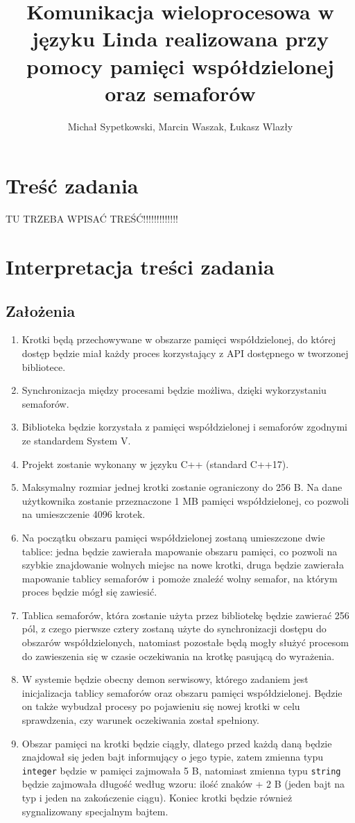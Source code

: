 \documentclass{article}
\title{Komunikacja wieloprocesowa w języku Linda realizowana przy pomocy pamięci współdzielonej oraz semaforów}
\author{Michał Sypetkowski, Marcin Waszak, Łukasz Wlazły}
\date{}
\begin{document}
	\maketitle
	\newpage
	
	\section{Treść zadania}
	TU TRZEBA WPISAĆ TREŚĆ!!!!!!!!!!!!!
	
	\section{Interpretacja treści zadania}
	\subsection{Założenia}
	\begin{enumerate}
		\item Krotki będą przechowywane w obszarze pamięci współdzielonej, do której dostęp będzie miał każdy proces korzystający z API dostępnego w tworzonej bibliotece.
		\item Synchronizacja między procesami będzie możliwa, dzięki wykorzystaniu semaforów.
		\item Biblioteka będzie korzystała z pamięci współdzielonej i semaforów zgodnymi ze standardem System V.
		\item Projekt zostanie wykonany w języku C++ (standard C++17).
		\item Maksymalny rozmiar jednej krotki zostanie ograniczony do 256 B. Na dane użytkownika zostanie przeznaczone 1 MB pamięci współdzielonej, co pozwoli na umieszczenie 4096 krotek.
		\item Na początku obszaru pamięci współdzielonej zostaną umieszczone dwie tablice: jedna będzie zawierała mapowanie obszaru pamięci, co pozwoli na szybkie znajdowanie wolnych miejsc na nowe krotki, druga będzie zawierała mapowanie tablicy semaforów i pomoże znaleźć wolny semafor, na którym proces będzie mógł się zawiesić.
		\item Tablica semaforów, która zostanie użyta przez bibliotekę będzie zawierać 256 pól, z czego pierwsze cztery zostaną użyte do synchronizacji dostępu do obszarów współdzielonych, natomiast pozostałe będą mogły służyć procesom do zawieszenia się w czasie oczekiwania na krotkę pasującą do wyrażenia.
		\item W systemie będzie obecny demon serwisowy, którego zadaniem jest inicjalizacja tablicy semaforów oraz obszaru pamięci współdzielonej. Będzie on także wybudzał procesy po pojawieniu się nowej krotki w celu sprawdzenia, czy warunek oczekiwania został spełniony.
		\item Obszar pamięci na krotki będzie ciągły, dlatego przed każdą daną będzie znajdował się jeden bajt informujący o jego typie, zatem zmienna typu \texttt{integer} będzie w pamięci zajmowała 5 B, natomiast zmienna typu \texttt{string} będzie zajmowała długość według wzoru: ilość znaków + 2 B (jeden bajt na typ i jeden na zakończenie ciągu). Koniec krotki będzie również sygnalizowany specjalnym bajtem.
	\end{enumerate}
\end{document}

